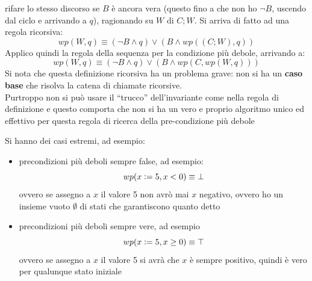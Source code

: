 \begin{itemize}
				      					      rifare lo stesso discorso se $B$ è ancora vera (questo fino a che non ho $\neg
				      					      B$, uscendo dal ciclo e arrivando a $q$), ragionando su $W$ di $C;W$. Si
				      					      arriva di fatto ad una regola ricorsiva:
				      					      \[wp(W,q)\equiv(\neg B\land q)\lor(B\land wp((C;W),q))\]
				      					      Applico quindi la regola della sequenza per la condizione più debole,
				      					      arrivando a:
				      					      \[wp(W,q)\equiv(\neg B\land q)\lor(B\land wp(C, wp(W,q)))\]
				      					      Si nota che questa definizione ricorsiva ha un problema grave: non si ha un
				      					      \textbf{caso base} che risolva la catena di chiamate ricorsive.\\
				      					      Purtroppo non si può usare il ``trucco'' dell'invariante come nella regola di
				      					      definizione e questo comporta che non si ha un vero e proprio algoritmo unico
				      					      ed effettivo per questa regola di ricerca della pre-condizione più debole
				      				\end{itemize}
				      				Si hanno dei casi estremi, ad esempio:
				      				\begin{itemize}
				      					\item precondizioni più deboli sempre false, ad esempio:
				      					      \[wp(x\cceq5,x<0)\equiv\bot\]
				      					      ovvero se assegno a $x$ il valore 5 non avrò mai $x$ negativo,
				      					      ovvero ho un insieme vuoto $\emptyset$ di stati che garantiscono quanto detto
				      					\item precondizioni più deboli sempre vere, ad esempio
				      					      \[wp(x\cceq 5,x\geq0)\equiv\top\]
				      					      ovvero se assegno a $x$ il valore 5 si avrà che $x$ è sempre
				      					      positivo, quindi è vero per qualunque stato iniziale
				      				\end{itemize}
